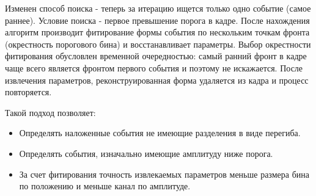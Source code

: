 \documentclass[a4paper,14pt]{extreport}
\begin{document}
Изменен способ поиска - теперь за итерацию ищется только одно событие (самое раннее). Условие поиска - первое превышение порога в кадре. После нахождения алгоритм производит фитирование формы события по нескольким точкам фронта (окрестность порогового бина) и восстанавливает параметры. Выбор окрестности фитирования обусловлен временной очередностью: самый ранний фронт в кадре чаще всего является фронтом первого события и поэтому не искажается. После извлечения параметров, реконструированная форма удаляется из кадра и процесс повторяется.

Такой подход позволяет:

\begin{itemize}
    \item Определять наложенные события не имеющие разделения в виде перегиба.
    \item Определять события, изначально имеющие амплитуду ниже порога.
    \item За счет фитирования точность извлекаемых параметров меньше размера бина по положению и меньше канал по амплитуде.
\end{itemize}
\end{document}
